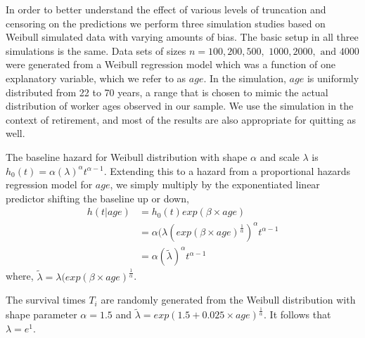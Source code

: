 \documentclass[12pt,letterpaper]{article}
\begin{document}
In order to better understand the effect of various levels of truncation and censoring on the predictions we perform three simulation studies based on Weibull simulated data with varying amounts of bias. The basic setup in all three simulations is the same. Data sets of sizes $n =100, 200, 500,$ $1000, 2000,$ $\text{and } 4000$ were generated from a Weibull regression model which was a function of one explanatory variable, which we refer to as $age$.  In the simulation, $age$ is uniformly distributed from 22 to 70 years, a range that is chosen to mimic the actual distribution of worker ages observed in our sample. We use the simulation in the context of retirement, and most of the results are also appropriate for quitting as well.

The baseline hazard for Weibull distribution with shape $\alpha$ and scale $\lambda$ is $h_0(t)=\alpha(\lambda)^\alpha t^{\alpha-1}$.  Extending this to a hazard from a proportional hazards regression model for $age$, we simply multiply by the exponentiated linear predictor shifting the baseline up or down,
\begin{equation} \label{eq:weibull}
\begin{split}%
h(t|age) & =h_0(t)exp(\beta \times age) \\
&=\alpha (\lambda (exp(\beta \times age)^{\frac{1}{\alpha}})^\alpha t^{\alpha-1} \\
&=\alpha(\tilde{\lambda} )^\alpha t^{\alpha-1}
\end{split}
\end{equation}
where, $\tilde{\lambda}=\lambda (exp(\beta \times age)^{\frac{1}{\alpha}}$.

The survival times $T_i$ are randomly generated from the Weibull distribution with shape parameter $\alpha=1.5$ and $\tilde{\lambda}=exp(1.5 +0.025 \times age)^{\frac{1}{\alpha}}$.  It follows that $\lambda = e^1$.
\end{document}
